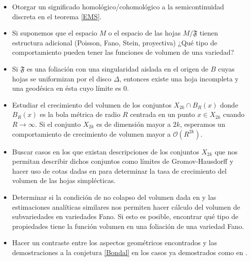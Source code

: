 \documentclass{article}
\begin{document}
\begin{itemize}
        \item Otorgar un significado homol\'ogico/cohomol\'ogico a la semicontinuidad discreta en el teorema \ref{EMS}.

        \item Si suponemos que el espacio $M$ o el espacio de las hojas $M/\mathfrak{F}$ tienen estructura adicional (Poisson, Fano, Stein, proyectiva) 
        ¿Qu\'e tipo de comportamiento pueden tener las funciones de volumen de una variedad?

        \item Si $\mathfrak{F}$ es una foliaci\'on con una singularidad aislada en el origen de $B$ cuyas hojas se uniformizan por el disco $\Delta$,
        entonces existe una hoja incompleta y una geod\'esica en \'esta cuyo l\'imite es $0$.  

        \item Estudiar el crecimiento del volumen de los conjuntos $X_{2k}\cap B_{R}(x)$ donde $B_R(x)$ es la bola m\'etrica 
        de radio $R$ centrada en un punto $x\in X_{2k}$ cuando $R\rightarrow\infty$. Si el conjunto $X_{2k}$ es 
        de dimensi\'on mayor a $2k$, esperamos un comportamiento de crecimiento de volumen mayor a $\mathcal{O}(R^{2k})$.
        
        \item Buscar casos en los que existan descripciones de los conjuntos $X_{2k}$ que nos permitan describir dichos conjuntos
        como l\'imites de Gromov-Hausdorff y hacer uso de cotas dadas en \cite{D-SS} para determinar la tasa de crecimiento
        del volumen de las hojas simpl\'ecticas.

        \item Determinar si la condici\'on de no colapso del volumen dada en \cite{D-SS} y las estimaciones anal\'iticas similares
        nos permiten hacer c\'alculo del volumen de subvariedades en variedades Fano. Si esto es posible, encontrar
        qu\'e tipo de propiedades tiene la funci\'on volumen en una foliaci\'on de una variedad Fano.

        \item Hacer un contraste entre los aspectos geom\'etricos encontrados y las demostraciones a la conjetura \ref{Bondal} en los
        casos ya demostrados como en \cite{Gua-Pym}.
\end{itemize}
\end{document}
